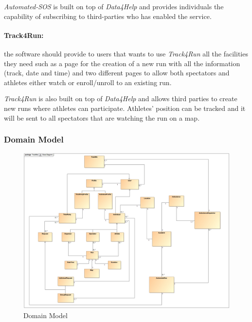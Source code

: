 \documentclass[a4paper]{article}
\begin{document}
    \textit{Automated-SOS} is built on top of \textit{Data4Help} and provides individuals the capability of subscribing to third-parties who has enabled the service.
    
    \paragraph{Track4Run: } the software should provide to users that wants to use \textit{Track4Run} all the facilities they need such as a page for the creation of a new run with all the information (track, date and time) and two different pages to allow both spectators and athletes either watch or enroll/unroll to an existing run.
    
    \textit{Track4Run} is also built on top of \textit{Data4Help} and allows third parties to create new runs where athletes can participate. Athletes' position can be tracked and it will be sent to all spectators that are watching the run on a map.
    
    \subsubsection{Domain Model}
    \begin{figure}[!ht]
        \centering
        \includegraphics[width=\textwidth]{images/UML/ClassDiagram.jpg}
        \caption{Domain Model}
    \end{figure}
    
    \newpage
    
\end{document}
